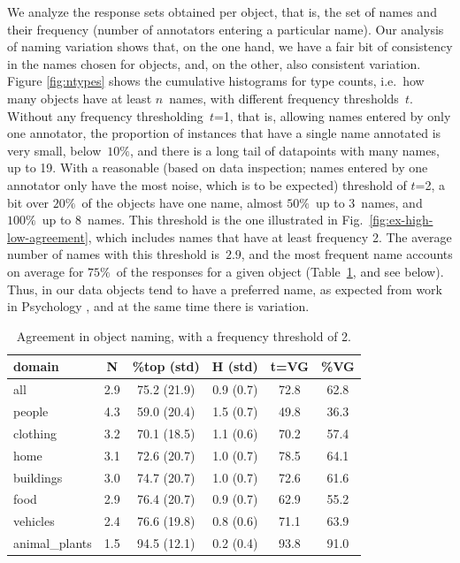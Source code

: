 We analyze the response sets obtained per object, that is, the set of names and their frequency (number of annotators entering a particular name).
Our analysis of naming variation shows that, on the one hand, we have a fair bit of consistency in the names chosen for objects, and, on the other, also consistent variation.
Figure \ref{fig:ntypes} shows the cumulative histograms for type counts, i.e.\ how many objects have at least $n$\ names, with different frequency thresholds~$t$.
Without any frequency thresholding~\mbox{$t$=1}, that is, allowing names entered by only one annotator, the proportion of instances that have a single name annotated is very small, below\ $10\%$, and there is a long tail of datapoints with many names, up to 19. 
With a reasonable (based on data inspection; names entered by one annotator only have the most noise, which is to be expected) threshold of $t$=2, a bit over $20\%$\ of the objects have one name, almost $50\%$\ up to $3$\ names, and $100\%$\ up to $8$\ names.
This threshold is the one illustrated in Fig.~\ref{fig:ex-high-low-agreement}, which includes names that have at least frequency 2.
The average number of names with this threshold is\ $2.9$, and the most frequent name accounts on average for $75\%$\ of the responses for a given object (Table~\ref{tab:agree}, and see below).
Thus, in our data objects tend to have a preferred name, as expected from work in Psychology \cite{rosch1976basic,jolicoeur1984pictures}, and at the same time there is variation.

\begin{table}
\centering
\small
\begin{tabular}{lccccc}
  \toprule
  domain &    N &         \%top (std) &          H (std) & t=VG &   \%VG \\
  \midrule
  all &  2.9 &  75.2 (21.9) &  0.9 (0.7) &   72.8 &  62.8 \\
  \midrule
  people &  4.3 &  59.0 (20.4) &  1.5 (0.7) &   49.8 &  36.3 \\
  clothing &  3.2 &  70.1 (18.5) &  1.1 (0.6) &   70.2 &  57.4\\
  home &  3.1 &  72.6 (20.7) &  1.0 (0.7) &   78.5 &  64.1 \\
  buildings &  3.0 &  74.7 (20.7) &  1.0 (0.7) &   72.6 &  61.6\\
  food &  2.9 &  76.4 (20.7) &  0.9 (0.7) &   62.9 &  55.2 \\
  vehicles &  2.4 &  76.6 (19.8) &  0.8 (0.6) &   71.1 &  63.9 \\
  animal\_plants &  1.5 &  94.5 (12.1) &  0.2 (0.4) &   93.8 &  91.0\\
\bottomrule
\end{tabular}
\vspace{-0.3cm}
\caption{Agreement in object naming, with a frequency threshold of 2.}
\label{tab:agree}
\end{table}

